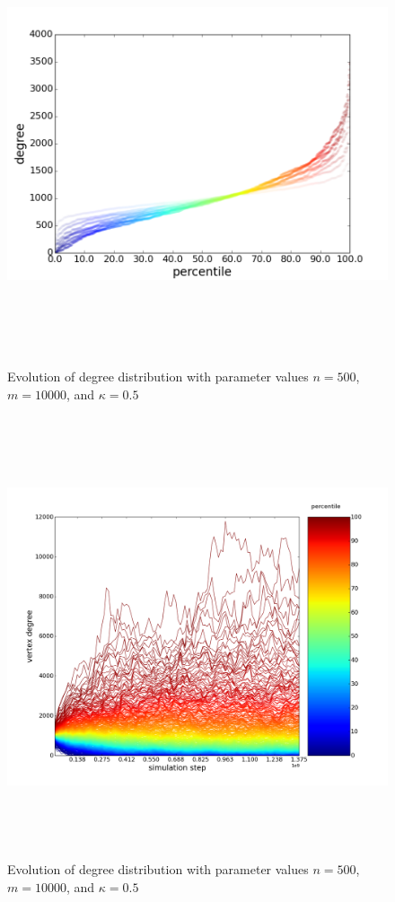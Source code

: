 \documentclass[11pt]{article}
\begin{document}
\begin{figure}[h!]
  \centering
  \includegraphics[height=130mm]{n_500_long_time}
  \caption{Evolution of degree distribution with parameter values $n=500$, $m=10000$, and $\kappa=0.5$}
  \label{fig:500st}
\end{figure}
\begin{figure}[h!]
  \centering
  \includegraphics[height=130mm]{n_500_long}
  \caption{Evolution of degree distribution with parameter values $n=500$, $m=10000$, and $\kappa=0.5$}
  \label{fig:500sv}
\end{figure}
\end{document}
